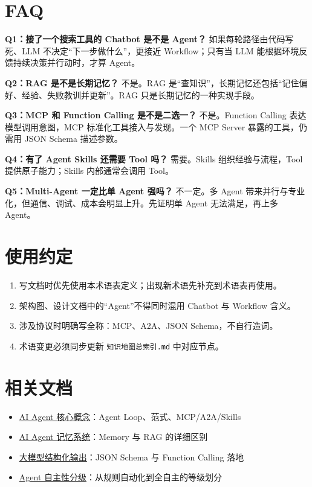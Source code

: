 \documentclass[9pt,a4paper,twocolumn]{ctexart}
\begin{document}
\section*{FAQ}


\textbf{Q1：接了一个搜索工具的 Chatbot 是不是 Agent？} 如果每轮路径由代码写死、LLM 不决定“下一步做什么”，更接近 Workflow；只有当 LLM 能根据环境反馈持续决策并行动时，才算 Agent。



\textbf{Q2：RAG 是不是长期记忆？} 不是。RAG 是“查知识”，长期记忆还包括“记住偏好、经验、失败教训并更新”。RAG 只是长期记忆的一种实现手段。



\textbf{Q3：MCP 和 Function Calling 是不是二选一？} 不是。Function Calling 表达模型调用意图，MCP 标准化工具接入与发现。一个 MCP Server 暴露的工具，仍需用 JSON Schema 描述参数。



\textbf{Q4：有了 Agent Skills 还需要 Tool 吗？} 需要。Skills 组织经验与流程，Tool 提供原子能力；Skills 内部通常会调用 Tool。



\textbf{Q5：Multi-Agent 一定比单 Agent 强吗？} 不一定。多 Agent 带来并行与专业化，但通信、调试、成本会明显上升。先证明单 Agent 无法满足，再上多 Agent。



\section*{使用约定}

\begin{enumerate}[itemsep=1pt, topsep=2pt]
  \item 写文档时优先使用本术语表定义；出现新术语先补充到术语表再使用。
  \item 架构图、设计文档中的“Agent”不得同时混用 Chatbot 与 Workflow 含义。
  \item 涉及协议时明确写全称：MCP、A2A、JSON Schema，不自行造词。
  \item 术语变更必须同步更新 \texttt{知识地图总索引.md} 中对应节点。
\end{enumerate}


\section*{相关文档}

\begin{itemize}[itemsep=1pt, topsep=2pt]
  \item \href{../02-Agent/01-Agent核心概念.md}{AI Agent 核心概念}：Agent Loop、范式、MCP/A2A/Skills
  \item \href{../02-Agent/02-Agent记忆系统.md}{AI Agent 记忆系统}：Memory 与 RAG 的详细区别
  \item \href{../01-LLM基础/02-大模型结构化输出.md}{大模型结构化输出}：JSON Schema 与 Function Calling 落地
  \item \href{02-Agent自主性分级.md}{Agent 自主性分级}：从规则自动化到全自主的等级划分
\end{itemize}
\end{document}
